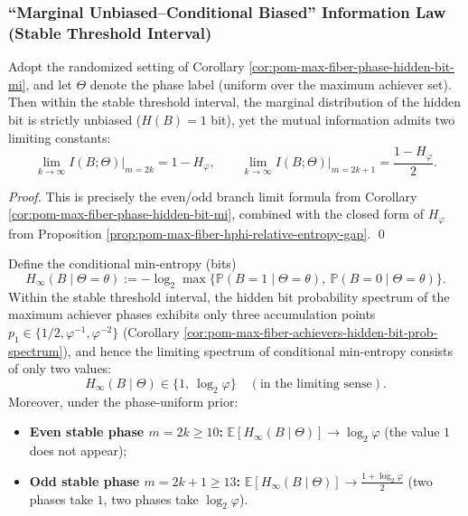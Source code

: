 \subsubsection{``Marginal Unbiased--Conditional Biased'' Information Law (Stable Threshold Interval)}

\begin{corollary}\label{cor:pom-max-fiber-hidden-bit-mi-gap}
Adopt the randomized setting of Corollary \ref{cor:pom-max-fiber-phase-hidden-bit-mi}, and let \(\Theta\) denote the phase label (uniform over the maximum achiever set).
Then within the stable threshold interval, the marginal distribution of the hidden bit is strictly unbiased (\(H(B)=1\) bit), yet the mutual information admits two limiting constants:
\[
\boxed{\;
\lim_{k\to\infty} I(B;\Theta)\Big|_{m=2k}=1-H_\varphi,\qquad
\lim_{k\to\infty} I(B;\Theta)\Big|_{m=2k+1}=\frac{1-H_\varphi}{2}. \;}
\]
\end{corollary}

\begin{proof}
This is precisely the even/odd branch limit formula from Corollary \ref{cor:pom-max-fiber-phase-hidden-bit-mi}, combined with the closed form of \(H_\varphi\) from Proposition \ref{prop:pom-max-fiber-hphi-relative-entropy-gap}. \qed
\end{proof}

\begin{proposition}\label{prop:pom-max-fiber-hidden-bit-minentropy-spectrum}
Define the conditional min-entropy (bits)
\[
H_\infty(B\mid \Theta=\theta):=-\log_2\max\{\mathbb{P}(B=1\mid\Theta=\theta),\ \mathbb{P}(B=0\mid\Theta=\theta)\}.
\]
Within the stable threshold interval, the hidden bit probability spectrum of the maximum achiever phases exhibits only three accumulation points
\(
p_1\in\{1/2,\varphi^{-1},\varphi^{-2}\}
\)
(Corollary \ref{cor:pom-max-fiber-achievers-hidden-bit-prob-spectrum}), and hence the limiting spectrum of conditional min-entropy consists of only two values:
\[
\boxed{\;
H_\infty(B\mid \Theta)\in\{1,\ \log_2\varphi\}\quad(\text{in the limiting sense}).\;}
\]
Moreover, under the phase-uniform prior:
\begin{itemize}
  \item \textbf{Even stable phase \(m=2k\ge 10\):} \(\mathbb{E}[H_\infty(B\mid\Theta)]\to \log_2\varphi\) (the value \(1\) does not appear);
  \item \textbf{Odd stable phase \(m=2k+1\ge 13\):} \(\mathbb{E}[H_\infty(B\mid\Theta)]\to \frac{1+\log_2\varphi}{2}\) (two phases take \(1\), two phases take \(\log_2\varphi\)).
\end{itemize}
\end{proposition}

